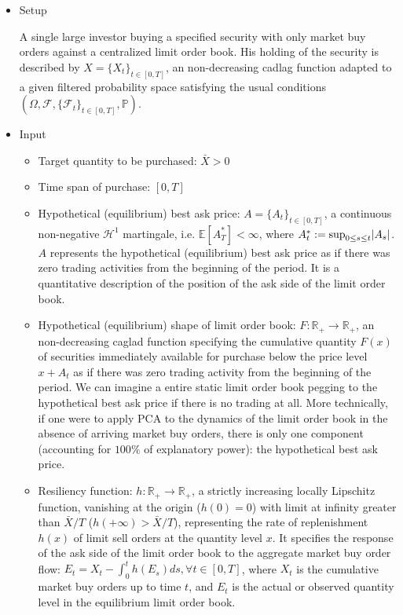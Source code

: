 \documentclass[openany,oneside]{article}
\theoremstyle{definition}
\theoremstyle{remark}
\newcommand{\E}{\mathbb{E}} %
\renewcommand{\P}{\mathbb{P}} %
\DeclarePairedDelimiter{\abs}{\lvert}{\rvert} %
\begin{document}
\begin{itemize}
\item Setup

A single large investor buying a specified security with only market buy orders against a centralized limit order book. His holding of the security is described by $X=\{X_t\}_{t\in[0,T]}$, an non-decreasing cadlag function adapted to a given filtered probability space satisfying the usual conditions $(\Omega, \mathcal{F}, \{\mathcal{F}_t\}_{t\in[0,T]}, \P)$.


\item Input

\begin{itemize}
\item Target quantity to be purchased: $\bar{X} > 0$

\item Time span of purchase: $[0,T]$

\item Hypothetical (equilibrium) best ask price: $A=\{A_t\}_{t\in[0,T]}$, a continuous non-negative $\mathcal{H}^1$ martingale, i.e. $\E[A^\ast_T] < \infty$, where $A^\ast_t := \sup_{0\le s\le t} \abs{A_s}$. $A$ represents the hypothetical (equilibrium) best ask price as if there was zero trading activities from the beginning of the period. It is a quantitative description of the position of the ask side of the limit order book.

\item Hypothetical (equilibrium) shape of limit order book: $F:\mathbb{R}_+ \to \mathbb{R}_+$, an non-decreasing caglad function specifying the cumulative quantity $F(x)$ of securities immediately available for purchase below the price level $x+A_t$ as if there was zero trading activity from the beginning of the period. We can imagine a entire static limit order book pegging to the hypothetical best ask price if there is no trading at all. More technically, if one were to apply PCA to the dynamics of the limit order book in the absence of arriving market buy orders, there is only one component (accounting for $100\%$ of explanatory power): the hypothetical best ask price.

\item Resiliency function: $h:\mathbb{R}_+ \to \mathbb{R}_+$, a strictly increasing locally Lipschitz function, vanishing at the origin ($h(0)=0$) with limit at infinity greater than $\bar{X}/T$ ($h(+\infty) > \bar{X}/T$), representing the rate of replenishment $h(x)$ of limit sell orders at the quantity level $x$. It specifies the response of the ask side of the limit order book to the aggregate market buy order flow: $E_t = X_t - \int_0^t h(E_s) ds, \forall t\in[0,T]$, where $X_t$ is the cumulative market buy orders up to time $t$, and $E_t$ is the actual or observed quantity level in the equilibrium limit order book.


\end{itemize}
\end{itemize}
\end{document}
